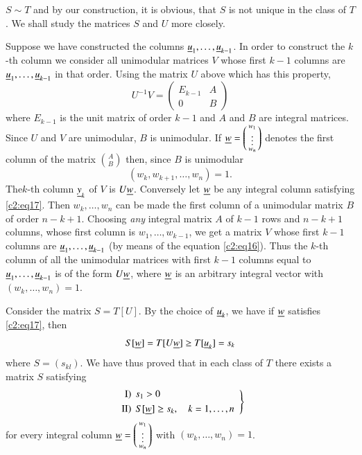 $S\sim T$ and by our construction, it is obvious, that $S$ is not
unique in the class of $T$. We shall study the matrices $S$ and $U$
more closely.

Suppose we have constructed the columns
$\underline{u}_{1},\ldots,\underline{u}_{k-1}$. In order to construct the $k$-th
column we consider all unimodular matrices $V$ whose first $k-1$
columns are $\underline{u}_{1},\ldots,\underline{u}_{k-1}$ in that order. Using the
matrix $U$ above which has this property, 
\begin{equation*}
U^{-1}V=
\begin{pmatrix}
E_{k-1} & A\\
0 & B
\end{pmatrix}
\tag{16}\label{c2:eq16}
\end{equation*}
where $E_{k-1}$ is the unit matrix of order $k-1$ and $A$ and $B$ are
integral matrices. Since $U$ and $V$ are unimodular, $B$ is
unimodular. If $\underline{w}=\left(\begin{smallmatrix}
  w_{1}\\ \vdots\\ w_{n}
\end{smallmatrix}\right)$ denotes the first column of the matrix
$\binom{A}{B}$ then, since $B$ is unimodular
\begin{equation*}
(w_{k},w_{k+1},\ldots,w_{n})=1.\tag{17}\label{c2:eq17}
\end{equation*}
The\pageoriginale $k$-th column $\underline{y}_{k}$ of $V$ is
$U\underline{w}$. Conversely let $\underline{w}$ be any integral column satisfying
\eqref{c2:eq17}. Then $w_{k},\ldots,w_{n}$ can be made the first column of
a unimodular matrix $B$ of order $n-k+1$. Choosing {\em any} integral
matrix $A$ of $k-1$ rows and $n-k+1$ columns, whose first column is
$w_{1},\ldots,w_{k-1}$, we get a matrix $V$ whose first $k-1$ columns
are $\underline{u}_{1},\ldots,\underline{u}_{k-1}$ (by means of the equation
\eqref{c2:eq16}). Thus the $k$-th column of all the unimodular matrices
with first $k-1$ columns equal to $\underline{u}_{1},\ldots,\underline{u}_{k-1}$ is
of the form $U\underline{w}$, where $\underline{w}$ is an arbitrary integral vector
with $(w_{k},\ldots,w_{n})=1$. 

Consider the matrix $S=T[U]$. By the choice of $\underline{u}_{k}$, we have
if $\underline{w}$ satisfies \eqref{c2:eq17}, then
$$
S[\underline{w}]=T[U\underline{w}]\geq T[\underline{u}_{k}]=s_{k}
$$
where $S=(s_{kl})$. We have thus proved that in each class of $T$
there exists a matrix $S$ satisfying 
$$
\left.
\begin{array}{r@{\;\,}l}
{\rm I)} & s_{1}>0 \\[3pt]
{\rm II)} & S[\ub{w}]\geq s_{k},\quad k=1,\ldots,n
\end{array}
\right\}
$$
for every integral column $\underline{w}=\left(\begin{smallmatrix}
  w_{1}\\ \vdots\\ w_{n}\end{smallmatrix}\right)$ with
$(w_{k},\ldots,w_{n})=1$.

